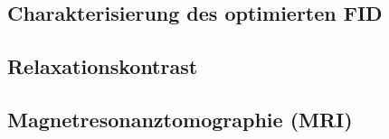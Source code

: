 \documentclass[../main.tex]{subfiles}
\begin{document}
    






\subsection{Charakterisierung des optimierten FID} %
    
     
    





\subsection{Relaxationskontrast}
       
    
\subsection{Magnetresonanztomographie (MRI)}
    
        
        
\end{document}
